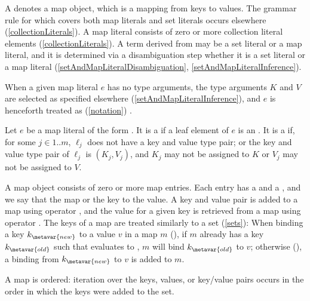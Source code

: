\documentclass[makeidx]{article}
\begin{document}
{\LMHash{}%
A  denotes a map object,
which is a mapping from keys to values.
The grammar rule for  which covers both
map literals and set literals occurs elsewhere
(\ref{collectionLiterals}).
A map literal consists of zero or more collection literal elements
(\ref{collectionLiterals}).
A term derived from 
may be a set literal or a map literal,
and it is determined via a disambiguation step
whether it is a set literal or a map literal
(\ref{setAndMapLiteralDisambiguation}, \ref{setAndMapLiteralInference}).

\LMHash{}%
When a given map literal $e$ has no type arguments,
the type arguments $K$ and $V$ are selected as specified elsewhere
(\ref{setAndMapLiteralInference}),
and $e$ is henceforth treated as
(\ref{notation})
.


\LMHash{}%
Let $e$ be a map literal of the form
.
It is a  if a leaf element of $e$ is an
.
It is a  if, for some $j \in 1 .. m$,
$\ell_j$ does not have a key and value type pair;
or the key and value type pair of $\ell_j$ is $(K_j, V_j)$,
and $K_j$ may not be assigned to $K$ or
$V_j$ may not be assigned to $V$.

\LMHash{}%
A map object consists of zero or more map entries.
Each entry has a  and a ,
and we say that the map
 or
the key to the value.
A key and value pair is
added to a map using operator \lit{[]=},
and the value for a given key is retrieved from a map using operator \lit{[]}.
The keys of a map are treated similarly to a set
(\ref{sets}):
When binding a key $k_{\metavar{new}}$ to a value $v$ in a map $m$
(),
if $m$ already has a key $k_{\metavar{old}}$ such that
 evaluates to \TRUE,
$m$ will bind $k_{\metavar{old}}$ to $v$;
otherwise
(),
a binding from $k_{\metavar{new}}$ to $v$ is added to $m$.

\LMHash{}%
A map is ordered: iteration over the keys, values, or key/value pairs
occurs in the order in which the keys were added to the set.

}
\end{document}
